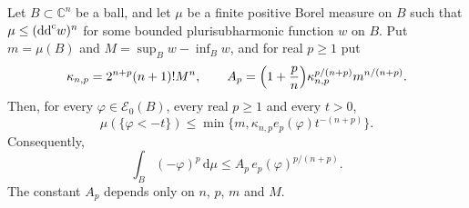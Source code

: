 \begin{theorem}\label{thm:bounded-subsolution-local-energy-moments}
Let $B\subset\mathbb C^n$ be a ball, and let $\mu$ be a finite positive Borel measure on $B$ such that $\mu\leq(\mathrm{dd}^{\mathrm{c}} w)^n$ for some bounded plurisubharmonic function $w$ on $B$. Put $m=\mu(B)$ and $M=\sup_Bw-\inf_Bw$, and for real $p\geq1$ put
\[
 \kappa_{n,p}=2^{n+p}(n+1)!M^n,
 \qquad A_p=\Bigl(1+\frac pn\Bigr)\kappa_{n,p}^{p/(n+p)}m^{n/(n+p)}.
\]
Then, for every $\varphi\in\mathcal E_0(B)$, every real $p\geq1$ and every $t>0$,
\begin{equation}\label{eq:local-energy-measure-tail}
 \mu(\{\varphi<-t\})
         \leq\min\{m,\kappa_{n,p}e_p(\varphi)t^{-(n+p)}\}.
\end{equation}
Consequently,
\begin{equation}\label{eq:local-energy-measure-moment}
 \int_B(-\varphi)^p\,\mathrm d\mu
 \leq A_p\,e_p(\varphi)^{p/(n+p)}.
\end{equation}
The constant $A_p$ depends only on $n$, $p$, $m$ and $M$.
\end{theorem}
